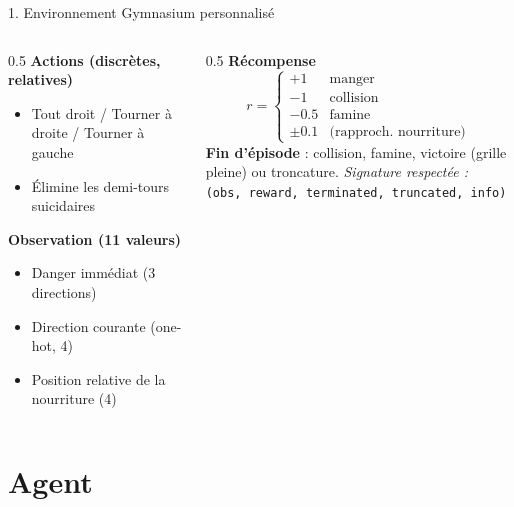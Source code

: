 \documentclass[11pt,aspectratio=169]{beamer}
\begin{document}
\begin{frame}{1. Environnement Gymnasium personnalisé}
  \begin{columns}
    \begin{column}{0.5\textwidth}
      \textbf{Actions (discrètes, relatives)}
      \begin{itemize}
        \item Tout droit / Tourner à droite / Tourner à gauche
        \item Élimine les demi-tours suicidaires
      \end{itemize}
      \medskip
      \textbf{Observation (11 valeurs)}
      \begin{itemize}
        \item Danger immédiat (3 directions)
        \item Direction courante (one-hot, 4)
        \item Position relative de la nourriture (4)
      \end{itemize}
    \end{column}
    \begin{column}{0.5\textwidth}
      \textbf{Récompense}
      \[
      r=\begin{cases}
        +1 & \text{manger}\\
        -1 & \text{collision}\\
        -0.5 & \text{famine}\\
        \pm0.1 & \text{(rapproch.\ nourriture)}
      \end{cases}
      \]
      \medskip
      \textbf{Fin d'épisode} : collision, famine, victoire (grille pleine)
      ou troncature.
      \medskip
      \footnotesize\textit{Signature respectée :}\\
      \texttt{(obs, reward, terminated, truncated, info)}
    \end{column}
  \end{columns}
\end{frame}

\section{Agent}
\end{document}
